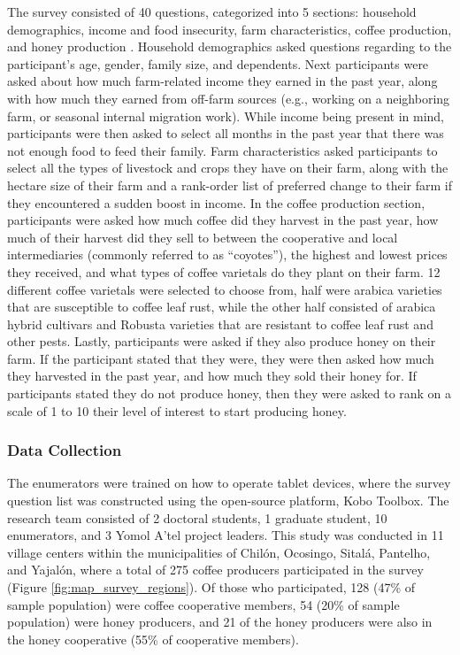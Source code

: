 \documentclass[../main.tex]{subfiles}
\begin{document}
The survey consisted of 40 questions, categorized into 5 sections: household demographics, income and food insecurity, farm characteristics, coffee production, and honey production . Household demographics asked questions regarding to the participant’s age, gender, family size, and dependents. Next participants were asked about how much farm-related income they earned in the past year, along with how much they earned from off-farm sources (e.g., working on a neighboring farm, or seasonal internal migration work). While income being present in mind, participants were then asked to select all months in the past year that there was not enough food to feed their family. Farm characteristics asked participants to select all the types of livestock and crops they have on their farm, along with the hectare size of their farm and a rank-order list of preferred change to their farm if they encountered a sudden boost in income. In the coffee production section, participants were asked how much coffee did they harvest in the past year, how much of their harvest did they sell to between the cooperative and local intermediaries (commonly referred to as “coyotes”), the highest and lowest prices they received, and what types of coffee varietals do they plant on their farm. 12 different coffee varietals were selected to choose from, half were arabica varieties that are susceptible to coffee leaf rust, while the other half consisted of arabica hybrid cultivars and Robusta varieties that are resistant to coffee leaf rust and other pests. Lastly, participants were asked if they also produce honey on their farm. If the participant stated that they were, they were then asked how much they harvested in the past year, and how much they sold their honey for. If participants stated they do not produce honey, then they were asked to rank on a scale of 1 to 10 their level of interest to start producing honey. 

\subsubsection{Data Collection}

The enumerators were trained on how to operate tablet devices, where the survey question list was constructed using the open-source platform, Kobo Toolbox.  The research team consisted of 2 doctoral students, 1 graduate student, 10 enumerators, and 3 Yomol A’tel project leaders. This study was conducted in 11 village centers within the municipalities of Chilón, Ocosingo, Sitalá, Pantelho, and Yajalón, where a total of 275 coffee producers participated in the survey (Figure \ref{fig:map_survey_regions}). Of those who participated, 128 (47\% of sample population) were coffee cooperative members, 54 (20\% of sample population) were honey producers, and 21 of the honey producers were also in the honey cooperative (55\% of cooperative members).
\end{document}
